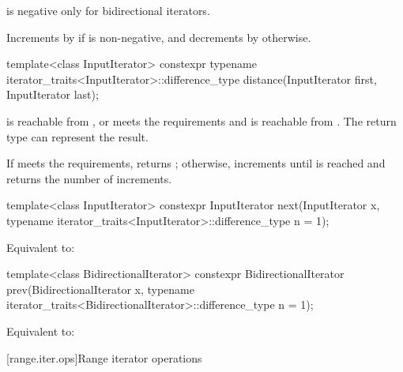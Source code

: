 \begin{itemdescr}
\pnum
\expects
{}
is negative only for bidirectional iterators.

\pnum
\effects
Increments  by  if  is non-negative, and
decrements  by  otherwise.
\end{itemdescr}

%
\begin{itemdecl}
template<class InputIterator>
  constexpr typename iterator_traits<InputIterator>::difference_type
    distance(InputIterator first, InputIterator last);
\end{itemdecl}

\begin{itemdescr}
\pnum
\expects
{} is reachable from , or
 meets
the  requirements and
 is reachable from .
The return type can represent the result.

\pnum
\effects
If  meets the  requirements,
returns ; otherwise, increments
 until  is reached and returns
the number of increments.
\end{itemdescr}

%
\begin{itemdecl}
template<class InputIterator>
  constexpr InputIterator next(InputIterator x,
    typename iterator_traits<InputIterator>::difference_type n = 1);
\end{itemdecl}

\begin{itemdescr}
\pnum
\effects
Equivalent to: 
\end{itemdescr}

%
\begin{itemdecl}
template<class BidirectionalIterator>
  constexpr BidirectionalIterator prev(BidirectionalIterator x,
    typename iterator_traits<BidirectionalIterator>::difference_type n = 1);
\end{itemdecl}

\begin{itemdescr}
\pnum
\effects
Equivalent to: 
\end{itemdescr}

[range.iter.ops]{Range iterator operations}


